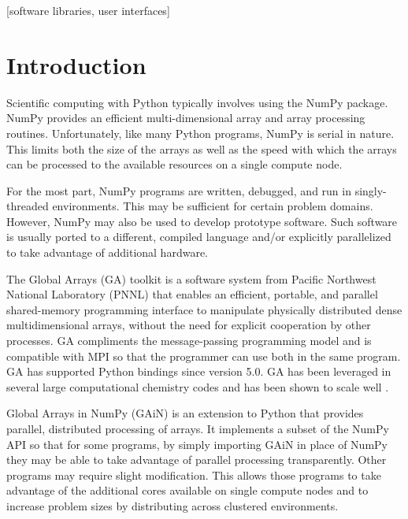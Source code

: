 \documentclass{sig-alt-release2}
\begin{document}
[software libraries, user interfaces]



\section{Introduction}
Scientific computing with Python\cite{Ros90} typically involves using the
NumPy\cite{Oli06}  package.  NumPy provides an efficient multi-dimensional
array and array processing routines. Unfortunately, like many Python programs,
NumPy is serial in nature.  This limits both the size of the arrays as well as
the speed with which the arrays can be processed to the available resources on
a single compute node.

For the most part, NumPy programs are written, debugged, and run in
singly-threaded environments. This may be sufficient for certain problem
domains. However, NumPy may also be used to develop prototype software. Such
software is usually ported to a different, compiled language and/or explicitly
parallelized to take advantage of additional hardware.

The Global Arrays (GA) toolkit \cite{Nie06,Nie10,Pnl11} is a software system
from Pacific Northwest National Laboratory (PNNL) that enables an efficient,
portable, and parallel shared-memory programming interface to manipulate
physically distributed dense multidimensional arrays, without the need for
explicit cooperation by other processes. GA compliments the message-passing
programming model and is compatible with MPI\cite{Gro99a} so that the
programmer can use both in the same program. GA has supported Python bindings
since version 5.0. GA has been leveraged in several large computational
chemistry codes and has been shown to scale well \cite{Apr09}.

Global Arrays in NumPy (GAiN)\cite{Dai09,Dai11} is an extension to Python that
provides parallel, distributed processing of arrays. It implements a subset of
the NumPy API so that for some programs, by simply importing GAiN in place of
NumPy they may be able to take advantage of parallel processing transparently.
Other programs may require slight modification. This allows those programs to
take advantage of the additional cores available on single compute nodes and to
increase problem sizes by distributing across clustered environments.
\end{document}

